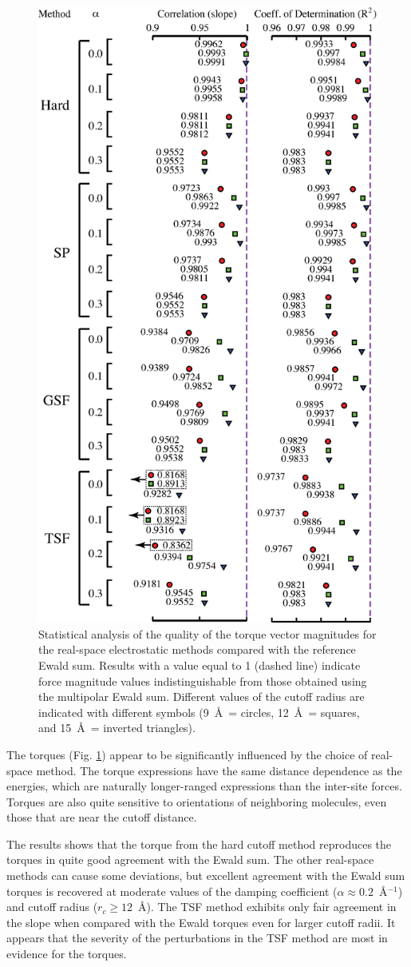 \begin{figure}
  \centering
  \includegraphics[width=0.6\linewidth]{torquePlot_slopeCorrelation_combined.eps}
  \caption{Statistical analysis of the quality of the torque vector
    magnitudes for the real-space electrostatic methods compared with
    the reference Ewald sum. Results with a value equal to 1 (dashed
    line) indicate force magnitude values indistinguishable from those
    obtained using the multipolar Ewald sum.  Different values of the
    cutoff radius are indicated with different symbols (9~\AA\ =
    circles, 12~\AA\ = squares, and 15~\AA\ = inverted
    triangles).\label{fig:slopeCorr_torque}}
\end{figure}

The torques (Fig. \ref{fig:slopeCorr_torque}) appear to be
significantly influenced by the choice of real-space method.  The
torque expressions have the same distance dependence as the energies,
which are naturally longer-ranged expressions than the inter-site
forces.  Torques are also quite sensitive to orientations of
neighboring molecules, even those that are near the cutoff distance.

The results shows that the torque from the hard cutoff method
reproduces the torques in quite good agreement with the Ewald sum.
The other real-space methods can cause some deviations, but excellent
agreement with the Ewald sum torques is recovered at moderate values
of the damping coefficient ($\alpha \approx 0.2$~\AA$^{-1}$) and cutoff
radius ($r_c \ge 12$~\AA).  The TSF method exhibits only fair agreement
in the slope when compared with the Ewald torques even for larger
cutoff radii.  It appears that the severity of the perturbations in
the TSF method are most in evidence for the torques.

